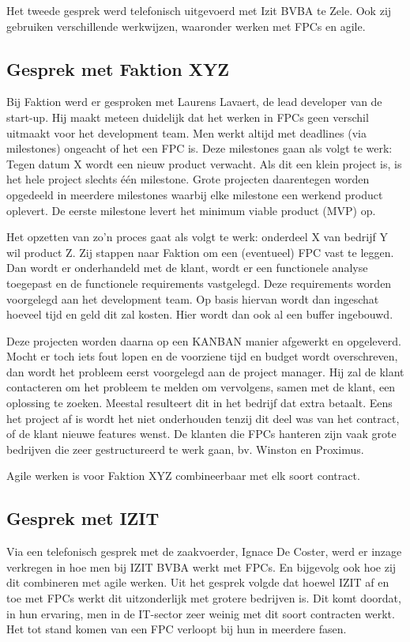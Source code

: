 \documentclass{hogent-article}
\begin{document}
    Het tweede gesprek werd telefonisch uitgevoerd met Izit BVBA te Zele. Ook zij gebruiken verschillende werkwijzen, waaronder werken met FPCs en agile.
    
    \subsection{Gesprek met Faktion XYZ}
    Bij Faktion werd er gesproken met Laurens Lavaert, de lead developer van de start-up. Hij maakt meteen duidelijk dat het werken in FPCs geen verschil uitmaakt voor het development team. Men werkt altijd met deadlines (via milestones) ongeacht of het een FPC is. Deze milestones gaan als volgt te werk: Tegen datum X wordt een nieuw product verwacht. Als dit een klein project is, is het hele project slechts één milestone. Grote projecten daarentegen worden opgedeeld in meerdere milestones waarbij elke milestone een werkend product oplevert. De eerste milestone levert het minimum viable product (MVP) op.
    
    Het opzetten van zo'n proces gaat als volgt te werk: onderdeel X van bedrijf Y wil product Z. Zij stappen naar Faktion om een (eventueel) FPC vast te leggen. Dan wordt er onderhandeld met de klant, wordt er een functionele analyse toegepast en de functionele requirements vastgelegd. Deze requirements worden voorgelegd aan het development team. Op basis hiervan wordt dan ingeschat hoeveel tijd en geld dit zal kosten. Hier wordt dan ook al een buffer ingebouwd.
    
    Deze projecten worden daarna op een KANBAN manier afgewerkt en opgeleverd. Mocht er toch iets fout lopen en de voorziene tijd en budget wordt overschreven, dan wordt het probleem eerst voorgelegd aan de project manager. Hij zal de klant contacteren om het probleem te melden om vervolgens, samen met de klant, een oplossing te zoeken. Meestal resulteert dit in het bedrijf dat extra betaalt. Eens het project af is wordt het niet onderhouden tenzij dit deel was van het contract, of de klant nieuwe features wenst. De klanten die FPCs hanteren zijn vaak grote bedrijven die zeer gestructureerd te werk gaan, bv. Winston en Proximus.
    
    Agile werken is voor Faktion XYZ combineerbaar met elk soort contract.
    
    \subsection{Gesprek met IZIT}
    Via een telefonisch gesprek met de zaakvoerder, Ignace De Coster, werd er inzage verkregen in hoe men bij IZIT BVBA werkt met FPCs. En bijgevolg ook hoe zij dit combineren met agile werken. Uit het gesprek volgde dat hoewel IZIT af en toe met FPCs werkt dit uitzonderlijk met grotere bedrijven is. Dit komt doordat, in hun ervaring, men in de IT-sector zeer weinig met dit soort contracten werkt. Het tot stand komen van een FPC verloopt bij hun in meerdere fasen.
    
\end{document}
